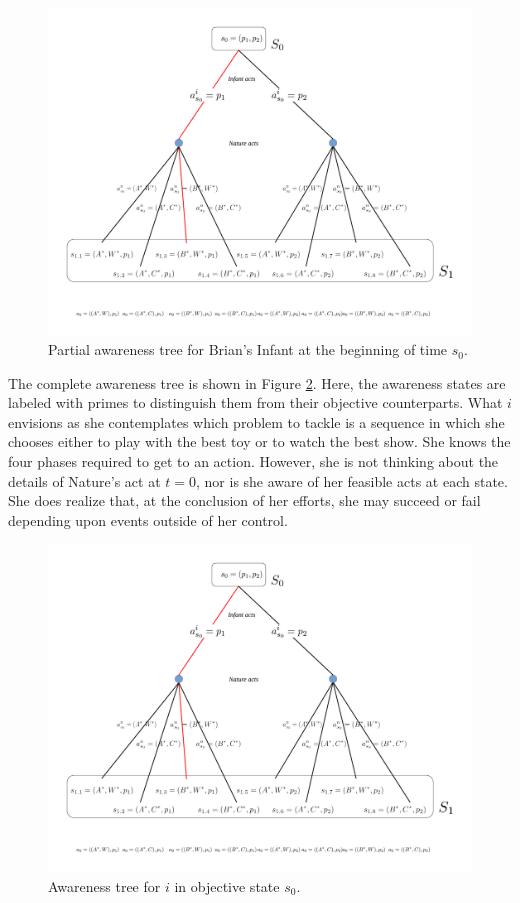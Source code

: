 \documentclass[
11pt,
titlepage,
reqno,
]{article}%
\theoremstyle{definition}
\begin{document}
\begin{figure}[h!]
	\centering
	\includegraphics*[page=5,trim = 0in 1in 0in 0in,scale=.6]{Awareness_Diagrams_All}
	\caption{Partial awareness tree for Brian's Infant at the beginning of time $s_{0}$.\label{Diag: p-05}}%
\end{figure}

The complete awareness tree is shown in Figure \ref{Diag: p-06}.
Here, the awareness states are labeled with primes to distinguish them from their objective counterparts.
What $i$ envisions as she contemplates which problem to tackle is a sequence in which she chooses either to play with the best toy or to watch the best show.
She knows the four phases required to get to an action.
However, she is not thinking about the details of Nature's act at $t=0$, nor is she aware of her feasible acts at each state.
She does realize that, at the conclusion of her efforts, she may succeed or fail depending upon events outside of her control.

\begin{figure}[h!]
	\centering
	\includegraphics*[page=6,trim = 0in .5in 5in 0in,scale=.7]{Awareness_Diagrams_All}
	\caption{Awareness tree for $i$ in objective state $s_{0}$.\label{Diag: p-06}}%
\end{figure}
\end{document}
